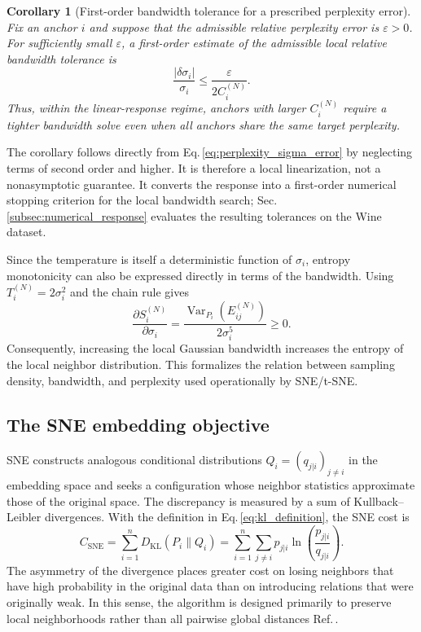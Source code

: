 \documentclass[11pt,a4paper]{article}
\newcommand{\KL}{D_{\mathrm{KL}}}
\newcommand{\Var}{\operatorname{Var}}
\theoremstyle{definition}
\theoremstyle{plain}
\newtheorem{corollary}[proposition]{Corollary}
\begin{document}
\begin{corollary}[First-order bandwidth tolerance for a prescribed perplexity error]
\label{cor:perplexity_tolerance}
Fix an anchor $i$ and suppose that the admissible relative perplexity error is $\varepsilon>0$. For sufficiently small $\varepsilon$, a first-order estimate of the admissible local relative bandwidth tolerance is
\begin{equation}
    \frac{|\delta\sigma_i|}{\sigma_i}
    \le
    \frac{\varepsilon}{2C_i^{(N)}}.
    \label{eq:perplexity_sigma_tolerance}
\end{equation}
Thus, within the linear-response regime, anchors with larger $C_i^{(N)}$ require a tighter bandwidth solve even when all anchors share the same target perplexity.
\end{corollary}

The corollary follows directly from Eq.\,\eqref{eq:perplexity_sigma_error} by neglecting terms of second order and higher. It is therefore a local linearization, not a nonasymptotic guarantee. It converts the response into a first-order numerical stopping criterion for the local bandwidth search; Sec.\,\ref{subsec:numerical_response} evaluates the resulting tolerances on the Wine dataset.

Since the temperature is itself a deterministic function of $\sigma_i$, entropy monotonicity can also be expressed directly in terms of the bandwidth. Using $T_i^{(N)}=2\sigma_i^2$ and the chain rule gives
\begin{equation}
    \frac{\partial S_i^{(N)}}{\partial\sigma_i}
    =\frac{\Var_{P_i}(E_{ij}^{(N)})}{2\sigma_i^5}
    \ge0.
    \label{eq:sne_entropy_sigma}
\end{equation}
Consequently, increasing the local Gaussian bandwidth increases the entropy of the local neighbor distribution. This formalizes the relation between sampling density, bandwidth, and perplexity used operationally by SNE/t-SNE.

\subsection{The SNE embedding objective}
\label{subsec:sne_objective}

SNE constructs analogous conditional distributions $Q_i=(q_{j|i})_{j\ne i}$ in the embedding space and seeks a configuration whose neighbor statistics approximate those of the original space. The discrepancy is measured by a sum of Kullback--Leibler divergences. With the definition in Eq.\,\eqref{eq:kl_definition}, the SNE cost is
\begin{equation}
    C_{\mathrm{SNE}}
    =\sum_{i=1}^{n}\KL(P_i\|Q_i)
    =\sum_{i=1}^{n}\sum_{j\ne i}
      p_{j|i}\ln\left(\frac{p_{j|i}}{q_{j|i}}\right).
    \label{eq:sne_kl}
\end{equation}
The asymmetry of the divergence places greater cost on losing neighbors that have high probability in the original data than on introducing relations that were originally weak. In this sense, the algorithm is designed primarily to preserve local neighborhoods rather than all pairwise global distances Ref.\,\cite{hinton2002sne}.
\end{document}
